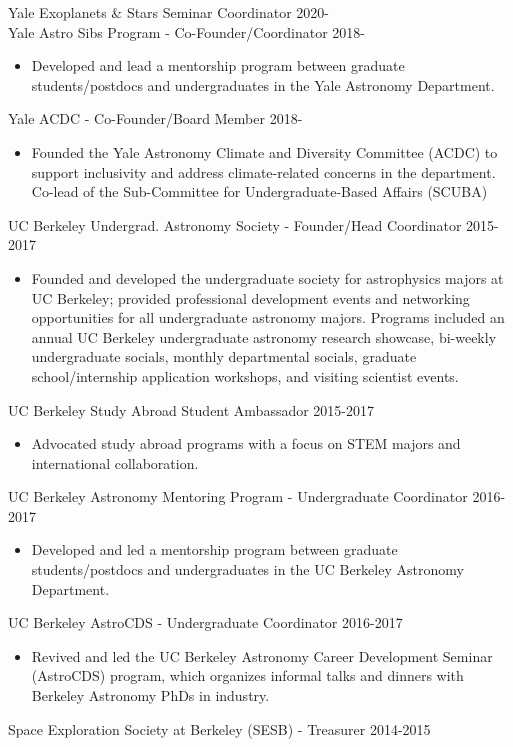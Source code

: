 \documentclass[margin]{res}
\begin{document}
\begin{resume}
Yale Exoplanets \& Stars Seminar Coordinator \hfill 2020- \\
Yale Astro Sibs Program - Co-Founder/Coordinator \hfill 2018-
\begin{itemize}
    \item Developed and lead a mentorship program between graduate students/postdocs and undergraduates in the Yale Astronomy Department.
\end{itemize}
\vspace{-3mm}
Yale ACDC - Co-Founder/Board Member \hfill 2018-
\begin{itemize}
    \item Founded the Yale Astronomy Climate and Diversity Committee (ACDC) to support inclusivity and address climate-related concerns in the department. Co-lead of the Sub-Committee for Undergraduate-Based Affairs (SCUBA)
\end{itemize}
\vspace{-3mm}
UC Berkeley Undergrad. Astronomy Society - Founder/Head Coordinator \hfill 2015-2017 
\begin{itemize}
    \item Founded and developed the undergraduate society for astrophysics majors at UC Berkeley; provided professional development events and networking opportunities for all undergraduate astronomy majors. Programs included an annual UC Berkeley undergraduate astronomy research showcase, bi-weekly undergraduate socials, monthly departmental socials, graduate school/internship application workshops, and visiting scientist events.
\end{itemize}
\vspace{-3mm}
UC Berkeley Study Abroad Student Ambassador \hfill 2015-2017 
\begin{itemize}
    \item Advocated study abroad programs with a focus on STEM majors and international collaboration.
\end{itemize}
\vspace{-3mm}
UC Berkeley Astronomy Mentoring Program - Undergraduate Coordinator \hfill 2016-2017 
\begin{itemize}
    \item Developed and led a mentorship program between graduate students/postdocs and undergraduates in the UC Berkeley Astronomy Department.
\end{itemize}
\vspace{-3mm}
UC Berkeley AstroCDS - Undergraduate Coordinator \hfill 2016-2017 
\begin{itemize}
    \item Revived and led the UC Berkeley Astronomy Career Development Seminar (AstroCDS) program, which organizes informal talks and dinners with Berkeley Astronomy PhDs in industry.
\end{itemize}
\vspace{-3mm}
Space Exploration Society at Berkeley (SESB) - Treasurer \hfill 2014-2015



\end{resume}
\end{document}
